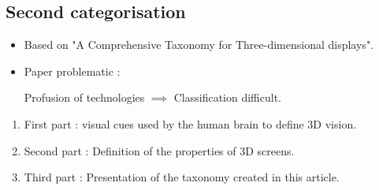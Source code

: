 \subsection{Second categorisation}
\begin{frame}
  \begin{itemize}
  \item Based on "A Comprehensive Taxonomy for Three-dimensional displays".

  \item Paper problematic : 

    \begin{center}
      Profusion of technologies $\implies$ Classification difficult.
    \end{center}

  \end{itemize}
  \begin{enumerate}
  \item First part : visual cues used by the human brain to define 3D vision.
  \item Second part : Definition of the properties of 3D screens.
  \item Third part : Presentation of the taxonomy created in this article.
  \end{enumerate}
\end{frame}

